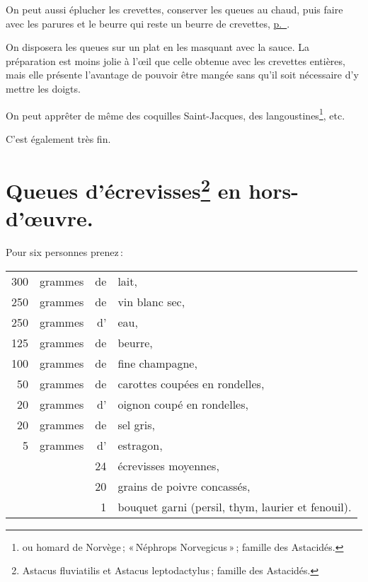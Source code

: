 On peut aussi éplucher les crevettes, conserver les queues au chaud, puis faire
avec les parures et le beurre qui reste un beurre de crevettes,
\hyperlink{p0287-3}{p. \pageref{pg0287-3}}.

On disposera les queues sur un plat en les masquant avec la sauce. La
préparation est moins jolie à l'œil que celle obtenue avec les crevettes
entières, mais elle présente l'avantage de pouvoir être mangée sans qu'il soit
nécessaire d'y mettre les doigts.

\sk


On peut apprêter de même des coquilles Saint-Jacques, des
langoustines\footnote{ou homard de Norvège ; « Néphrops Norvegicus » ; famille
des Astacidés.}, etc.

C'est également très fin.

\section*{\centering Queues d’écrevisses\footnote{Astacus fluviatilis et Astacus leptodactylus ; famille des Astacidés.} en hors-d’œuvre.}

Pour six personnes prenez :

\medskip

\footnotesize
\begin{longtable}{rrrp{16em}}
  300 & grammes    & de & lait,                                                                           \\
  250 & grammes    & de & vin blanc sec,                                                                  \\
  250 & grammes    & d' & eau,                                                                            \\
  125 & grammes    & de & beurre,                                                                         \\
  100 & grammes    & de & fine champagne,                                                                 \\
   50 & grammes    & de & carottes coupées en rondelles,                                                  \\
   20 & grammes    & d' & oignon coupé en rondelles,                                                      \\
   20 & grammes    & de & sel gris,                                                                       \\
    5 & grammes    & d' & estragon,                                                                       \\
      &            & 24 & écrevisses moyennes,                                                            \\
      &            & 20 & grains de poivre concassés,                                                     \\
      &            & 1  & bouquet garni (persil, thym, laurier et fenouil).                               \\
\end{longtable}
\normalsize


